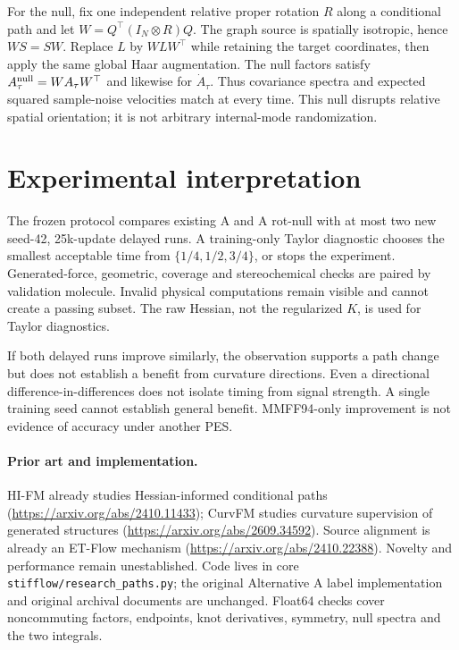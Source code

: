 \documentclass[11pt]{article}
\begin{document}
For the null, fix one independent relative proper rotation $R$ along a
conditional path and let $W=Q^\top(I_N\otimes R)Q$. The graph source is
spatially isotropic, hence $WS=SW$. Replace $L$ by $WLW^\top$ while retaining
the target coordinates, then apply the same global Haar augmentation.
The null factors satisfy $A_\tau^{\rm null}=WA_\tau W^\top$ and likewise
for $\dot A_\tau$. Thus covariance spectra and expected squared sample-noise
velocities match at every time. This null disrupts relative spatial
orientation; it is not arbitrary internal-mode randomization.

\section{Experimental interpretation}
The frozen protocol compares existing A and A rot-null with at most two
new seed-42, 25k-update delayed runs. A training-only Taylor diagnostic
chooses the smallest acceptable time from $\{1/4,1/2,3/4\}$, or stops the
experiment. Generated-force, geometric, coverage and stereochemical checks
are paired by validation molecule. Invalid physical computations remain
visible and cannot create a passing subset. The raw Hessian, not the
regularized $K$, is used for Taylor diagnostics.

If both delayed runs improve similarly, the observation supports a path
change but does not establish a benefit from curvature directions.
Even a directional difference-in-differences does not isolate timing from
signal strength. A single training seed cannot establish general benefit.
MMFF94-only improvement is not evidence of accuracy under another PES.

\paragraph{Prior art and implementation.}
HI-FM already studies Hessian-informed conditional paths
(\url{https://arxiv.org/abs/2410.11433}); CurvFM studies curvature supervision
of generated structures (\url{https://arxiv.org/abs/2609.34592}). Source
alignment is already an ET-Flow mechanism
(\url{https://arxiv.org/abs/2410.22388}). Novelty and performance remain
unestablished. Code lives in core \texttt{stifflow/research\_paths.py};
the original Alternative A label implementation and original archival
documents are unchanged. Float64 checks cover noncommuting factors,
endpoints, knot derivatives, symmetry, null spectra and the two integrals.
\end{document}
